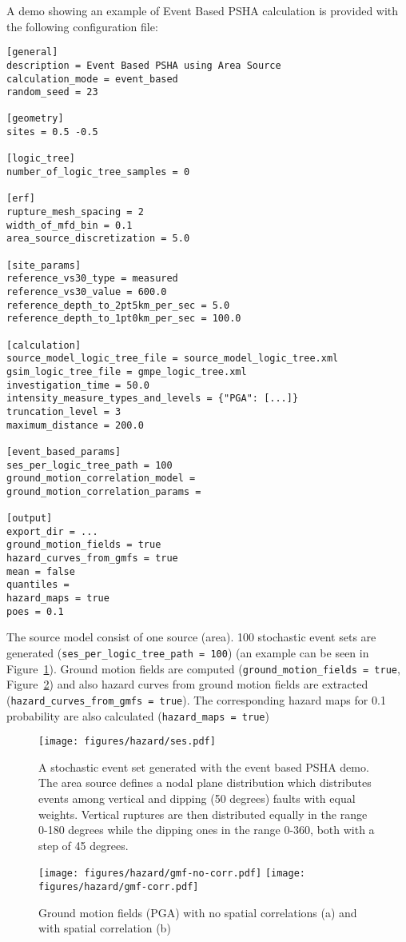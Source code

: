 A demo showing an example of Event Based PSHA calculation is provided with the
following configuration file:

\begin{Verbatim}[frame=single, commandchars=\\\{\}, fontsize=\normalsize]
[general]
description = Event Based PSHA using Area Source
calculation_mode = event_based
random_seed = 23

[geometry]
sites = 0.5 -0.5

[logic_tree]
number_of_logic_tree_samples = 0

[erf]
rupture_mesh_spacing = 2
width_of_mfd_bin = 0.1
area_source_discretization = 5.0

[site_params]
reference_vs30_type = measured
reference_vs30_value = 600.0
reference_depth_to_2pt5km_per_sec = 5.0
reference_depth_to_1pt0km_per_sec = 100.0

[calculation]
source_model_logic_tree_file = source_model_logic_tree.xml
gsim_logic_tree_file = gmpe_logic_tree.xml
investigation_time = 50.0
intensity_measure_types_and_levels = {"PGA": [...]}
truncation_level = 3
maximum_distance = 200.0

[event_based_params]
ses_per_logic_tree_path = 100
ground_motion_correlation_model =
ground_motion_correlation_params =

[output]
export_dir = ...
ground_motion_fields = true
hazard_curves_from_gmfs = true
mean = false
quantiles = 
hazard_maps = true
poes = 0.1
\end{Verbatim}

The source model consist of one source (area). 100 stochastic event sets  are
generated (\texttt{ses\_\-per\_\-logic\_\-tree\_\-path = 100}) (an example
can be seen in Figure~\ref{fig:ses}). Ground motion fields are computed
(\texttt{ground\_\-motion\_\-fields = true}, Figure~\ref{fig:gmfs}) and also
hazard curves from ground motion fields are extracted
(\texttt{hazard\_\-curves\_\-from\_\-gmfs = true}). The corresponding hazard
maps for 0.1 probability are also calculated (\texttt{hazard\_\-maps = true})

\begin{figure}
\centering
\subcaptionbox{}
{\texttt{[image: figures/hazard/ses.pdf]}} 
\caption{A stochastic event set generated with the event based PSHA demo. 
    The area source defines a nodal plane distribution which distributes 
    events among vertical and dipping (50 degrees) faults with equal weights. 
    Vertical ruptures are then distributed equally in the range 0-180 degrees 
    while the dipping ones in the range 0-360, both with a step of 45 degrees.}
\label{fig:ses}
\end{figure}

\begin{figure}
\centering
\subcaptionbox{}
{\texttt{[image: figures/hazard/gmf-no-corr.pdf]}} 
\subcaptionbox{}
{\texttt{[image: figures/hazard/gmf-corr.pdf]}} 
\caption{Ground motion fields (PGA) with no spatial correlations (a) and with spatial correlation (b)}
\label{fig:gmfs}
\end{figure}